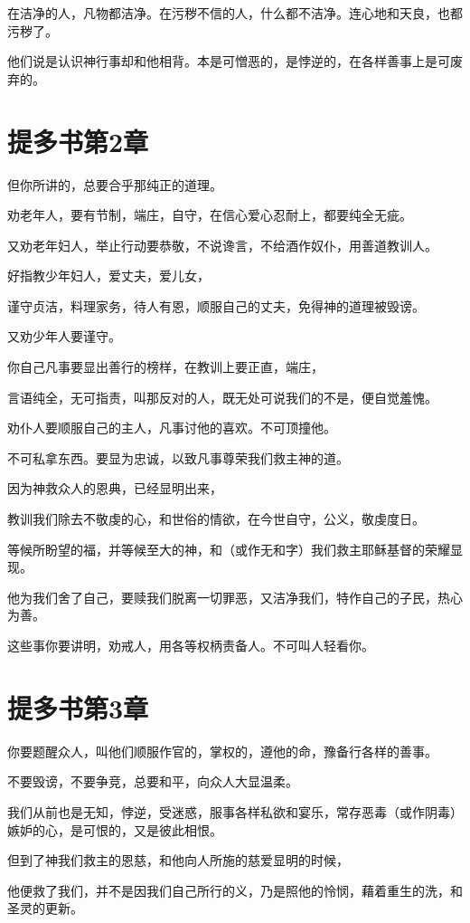 \documentclass[12pt,oneside]{book}
\begin{document}
在洁净的人，凡物都洁净。在污秽不信的人，什么都不洁净。连心地和天良，也都污秽了。

他们说是认识神行事却和他相背。本是可憎恶的，是悖逆的，在各样善事上是可废弃的。

\chapter{提多书第2章}
但你所讲的，总要合乎那纯正的道理。

劝老年人，要有节制，端庄，自守，在信心爱心忍耐上，都要纯全无疵。

又劝老年妇人，举止行动要恭敬，不说谗言，不给酒作奴仆，用善道教训人。

好指教少年妇人，爱丈夫，爱儿女，

谨守贞洁，料理家务，待人有恩，顺服自己的丈夫，免得神的道理被毁谤。

又劝少年人要谨守。

你自己凡事要显出善行的榜样，在教训上要正直，端庄，

言语纯全，无可指责，叫那反对的人，既无处可说我们的不是，便自觉羞愧。

劝仆人要顺服自己的主人，凡事讨他的喜欢。不可顶撞他。

不可私拿东西。要显为忠诚，以致凡事尊荣我们救主神的道。

因为神救众人的恩典，已经显明出来，

教训我们除去不敬虔的心，和世俗的情欲，在今世自守，公义，敬虔度日。

等候所盼望的福，并等候至大的神，和（或作无和字）我们救主耶稣基督的荣耀显现。

他为我们舍了自己，要赎我们脱离一切罪恶，又洁净我们，特作自己的子民，热心为善。

这些事你要讲明，劝戒人，用各等权柄责备人。不可叫人轻看你。

\chapter{提多书第3章}
你要题醒众人，叫他们顺服作官的，掌权的，遵他的命，豫备行各样的善事。

不要毁谤，不要争竞，总要和平，向众人大显温柔。

我们从前也是无知，悖逆，受迷惑，服事各样私欲和宴乐，常存恶毒（或作阴毒）嫉妒的心，是可恨的，又是彼此相恨。

但到了神我们救主的恩慈，和他向人所施的慈爱显明的时候，

他便救了我们，并不是因我们自己所行的义，乃是照他的怜悯，藉着重生的洗，和圣灵的更新。
\end{document}
